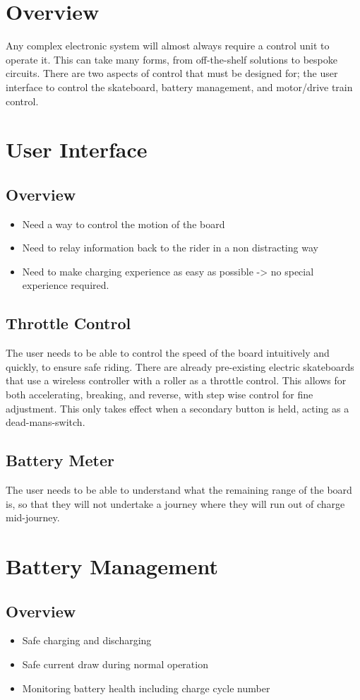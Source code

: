 \documentclass{article}
\begin{document}
\section{Overview}
	Any complex electronic system will almost always require a control unit to operate it. This can take many forms, from off-the-shelf solutions to bespoke circuits.
	There are two aspects of control that must be designed for; the user interface to control the skateboard, battery management, and motor/drive train control.
\section{User Interface}
	\subsection{Overview}
		\begin{itemize}
			\item Need a way to control the motion of the board
			\item Need to relay information back to the rider in a non distracting way
			\item Need to make charging experience as easy as possible -> no special experience required.
		\end{itemize}
	\subsection{Throttle Control}
		The user needs to be able to control the speed of the board intuitively and quickly, to ensure safe riding.
		There are already pre-existing electric skateboards that use a wireless controller with a roller as a throttle control. 
		This allows for both accelerating, breaking, and reverse, with step wise control for fine adjustment.
		This only takes effect when a secondary button is held, acting as a dead-mans-switch.
	\subsection{Battery Meter}
		The user needs to be able to understand what the remaining range of the board is, so that they will not undertake a journey where they will run out of charge mid-journey.
\section{Battery Management}
	\subsection{Overview}
		\begin{itemize}
			\item Safe charging and discharging 
			\item Safe current draw during normal operation
			\item Monitoring battery health including charge cycle number
		\end{itemize}
\end{document}
